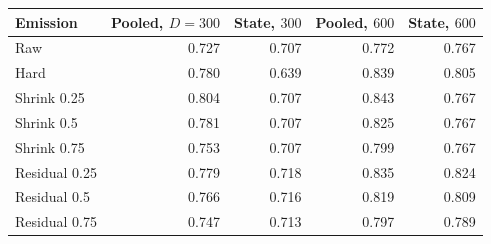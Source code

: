 \begin{tabular}{lrrrr}
\toprule
Emission & Pooled, $D=300$ & State, $300$ & Pooled, $600$ & State, $600$ \\
\midrule
Raw & 0.727 & 0.707 & 0.772 & 0.767 \\
Hard & 0.780 & 0.639 & 0.839 & 0.805 \\
Shrink 0.25 & 0.804 & 0.707 & 0.843 & 0.767 \\
Shrink 0.5 & 0.781 & 0.707 & 0.825 & 0.767 \\
Shrink 0.75 & 0.753 & 0.707 & 0.799 & 0.767 \\
Residual 0.25 & 0.779 & 0.718 & 0.835 & 0.824 \\
Residual 0.5 & 0.766 & 0.716 & 0.819 & 0.809 \\
Residual 0.75 & 0.747 & 0.713 & 0.797 & 0.789 \\
\bottomrule
\end{tabular}

